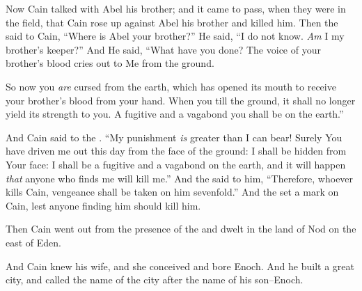 \bverse Now Cain talked with Abel his brother; and it came to pass, when they were in the field, that Cain rose up against Abel his brother and killed him.
\bverse Then the \lord said to Cain, ``Where is Abel your brother?'' He said, ``I do not know. \textit{Am} I my brother's keeper?''
\bverse And He said, ``What have you done? The voice of your brother's blood cries out to Me from the ground.

\bverse So now you \textit{are} cursed from the earth, which has opened its mouth to receive your brother's blood from your hand.
\bverse When you till the ground, it shall no longer yield its strength to you. A fugitive and a vagabond you shall be on the earth.''
	
\bverse And Cain said to the \lord. ``My punishment \textit{is} greater than I can bear!
\bverse Surely You have driven me out this day from the face of the ground: I shall be hidden from Your face: I shall be a fugitive and a vagabond on the earth, and it will happen \textit{that} anyone who finds me will kill me.''
\bverse And the \lord said to him, ``Therefore, whoever kills Cain, vengeance shall be taken on him sevenfold.'' And the \lord set a mark on Cain, lest anyone finding him should kill him.


\bverse Then Cain went out from the presence of the \lord and dwelt in the land of Nod on the east of Eden.

\bverse And Cain knew his wife, and she conceived and bore Enoch. And he built a great city, and called the name of the city after the name of his son--Enoch.
	
